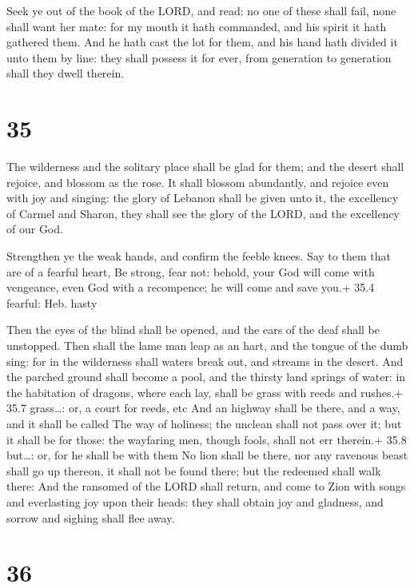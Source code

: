  Seek ye out of the book of the LORD, and read: no one of
these shall fail, none shall want her mate: for my mouth it hath
commanded, and his spirit it hath gathered them.  And he
hath cast the lot for them, and his hand hath divided it unto them by
line: they shall possess it for ever, from generation to generation
shall they dwell therein.

\hypertarget{section-34}{%
\section{35}\label{section-34}}

 The wilderness and the solitary place shall be glad for
them; and the desert shall rejoice, and blossom as the rose.
 It shall blossom abundantly, and rejoice even with joy and
singing: the glory of Lebanon shall be given unto it, the excellency of
Carmel and Sharon, they shall see the glory of the LORD, and the
excellency of our God.

 Strengthen ye the weak hands, and confirm the feeble
knees.  Say to them that are of a fearful heart, Be strong,
fear not: behold, your God will come with vengeance, even God with a
recompence; he will come and save you.+ 35.4 fearful: Heb. hasty

 Then the eyes of the blind shall be opened, and the ears of
the deaf shall be unstopped.  Then shall the lame man leap
as an hart, and the tongue of the dumb sing: for in the wilderness shall
waters break out, and streams in the desert.  And the
parched ground shall become a pool, and the thirsty land springs of
water: in the habitation of dragons, where each lay, shall be grass with
reeds and rushes.+ 35.7 grass\ldots: or, a court for reeds, etc
 And an highway shall be there, and a way, and it shall be
called The way of holiness; the unclean shall not pass over it; but it
shall be for those: the wayfaring men, though fools, shall not err
therein.+ 35.8 but\ldots: or, for he shall be with them  No
lion shall be there, nor any ravenous beast shall go up thereon, it
shall not be found there; but the redeemed shall walk there:
 And the ransomed of the LORD shall return, and come to
Zion with songs and everlasting joy upon their heads: they shall obtain
joy and gladness, and sorrow and sighing shall flee away.

\hypertarget{section-35}{%
\section{36}\label{section-35}}

